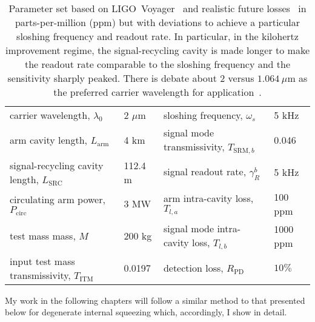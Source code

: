 \begin{table}[]
\centering
\begin{tabular}{@{}ll|ll@{}}
\toprule
carrier wavelength, $\lambda_0$ & 2 $\mu\text{m}$ & sloshing frequency, $\omega_s$ & 5 kHz \\
arm cavity length, $L_\text{arm}$ & 4 km & signal mode transmissivity, $T_{\text{SRM},b}$ & 0.046 \\
signal-recycling cavity length, $L_\text{SRC}$ & 112.4 m & signal readout rate, $\gamma^b_R$ & 5 kHz \\
circulating arm power, $P_\text{circ}$ & 3 MW & arm intra-cavity loss, $T_{l,a}$ & 100 ppm \\
test mass mass, $M$ & 200 kg & signal mode intra-cavity loss, $T_{l,b}$ & 1000 ppm \\
input test mass transmissivity, $T_\text{ITM}$ & 0.0197 & detection loss, $R_\text{PD}$ & $10\%$ \\ \bottomrule
\end{tabular}
\caption{Parameter set based on LIGO~Voyager~\cite{} and realistic future losses~\cite{zhangBroadbandSignalRecycling2021,} in parts-per-million (ppm) but with deviations to achieve a particular sloshing frequency and readout rate. In particular, in the kilohertz improvement regime, the signal-recycling cavity is made longer to make the readout rate comparable to the sloshing frequency and the sensitivity sharply peaked. There is debate about $2$ versus $1.064~\mu\text{m}$ as the preferred carrier wavelength for application~\cite{}.}
\label{tab:dIS_parameters}
\end{table}


My work in the following chapters will follow a similar method to that presented below for degenerate internal squeezing which, accordingly, I show in detail.

